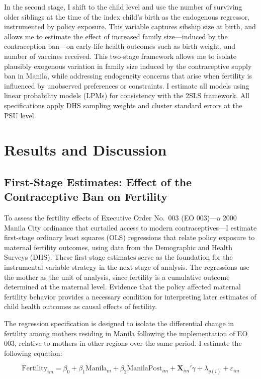 \documentclass[]{AEA}
\begin{document}
In the second stage, I shift to the child level and use the number of
surviving older siblings at the time of the index child's birth as the
endogenous regressor, instrumented by policy exposure. This variable
captures sibship size at birth, and allows me to estimate the effect of
increased family size---induced by the contraception ban---on early-life
health outcomes such as birth weight, and number of vaccines received.
This two-stage framework allows me to isolate plausibly exogenous
variation in family size induced by the contraceptive supply ban in
Manila, while addressing endogeneity concerns that arise when fertility
is influenced by unobserved preferences or constraints. I estimate all
models using linear probability models (LPMs) for consistency with the
2SLS framework. All specifications apply DHS sampling weights and
cluster standard errors at the PSU level.

\section{Results and Discussion}

\subsection{First-Stage Estimates: Effect of the Contraceptive Ban on Fertility}

To assess the fertility effects of Executive Order No.~003 (EO 003)---a
2000 Manila City ordinance that curtailed access to modern
contraceptives---I estimate first-stage ordinary least squares (OLS)
regressions that relate policy exposure to maternal fertility outcomes,
using data from the Demographic and Health Surveys (DHS). These
first-stage estimates serve as the foundation for the instrumental
variable strategy in the next stage of analysis. The regressions use the
mother as the unit of analysis, since fertility is a cumulative outcome
determined at the maternal level. Evidence that the policy affected
maternal fertility behavior provides a necessary condition for
interpreting later estimates of child health outcomes as causal effects
of fertility.

The regression specification is designed to isolate the differential
change in fertility among mothers residing in Manila following the
implementation of EO 003, relative to mothers in other regions over the
same period. I estimate the following equation:

\[
\text{Fertility}_{im} = \beta_0 + \beta_1 \text{Manila}_m + \beta_2 \text{ManilaPost}_{im} + \boldsymbol{X}_{im}'\gamma + \lambda_{y(i)} + \varepsilon_{im}
\]
\end{document}
